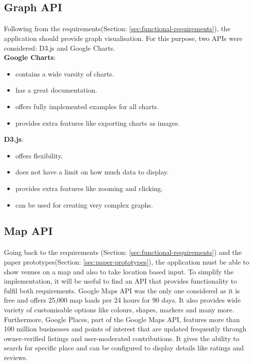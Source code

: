 \documentclass{l4proj}
\begin{document}
\subsection{Graph API}
\paragraph{}
Following from the requirements(Section: \ref{sec:functional-requirements}), the application should provide graph visualisation. For this purpose, two APIs were considered: D3.js and Google Charts.  
\\\hspace*{7mm}\textbf{Google Charts}:
\begin{multicols}{2}
	\begin{itemize}[noitemsep]
		\item contains a wide varsity of charts.
		\item has a great documentation.
		\item offers fully implemented examples for all charts. 
		\item provides extra features like exporting charts as images.
	\end{itemize} 
\end{multicols}
\textbf{D3.js}:
\begin{multicols}{2}
	\begin{itemize}[noitemsep]
		\item offers flexibility.
		\item does not have a limit on how much data to display.
		\item provides extra features like zooming and clicking.
		\item can be used for creating very complex graphs.
	\end{itemize} 
\end{multicols}
\subsection{Map API}
\paragraph{}
Going back to the requirements (Section: \ref{sec:functional-requirements}) and the paper prototypes(Section: \ref{sec:paper-prototypes}), the application must be able to show venues on a map and also to take location based input. To simplify the implementation, it will be useful to find an API that provides functionality to fulfil both requirements. Google Maps API\cite{mapusage} was the only one considered as it is free and offers 25,000 map loads per 24 hours for 90 days. It also provides wide variety of customisable options like colours, shapes, markers and many more. Furthermore, Google Places\cite{mapplace}, part of the Google Maps API, features more than 100 million businesses and points of interest that are updated frequently through owner-verified listings and user-moderated contributions. It gives the ability to search for specific place and can be configured to display details like ratings and reviews.
\end{document}
